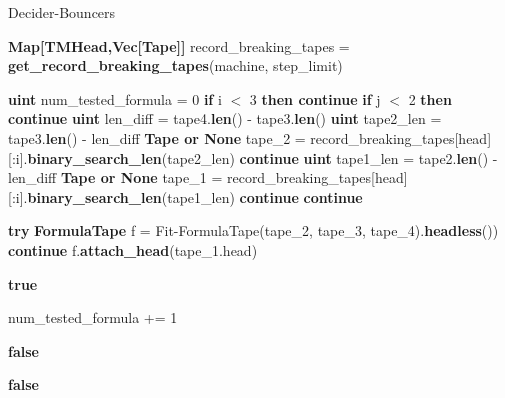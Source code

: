 \begin{algorithm}[h!]
    \caption{{\sc Decider-Bouncers}}\label{alg:decider-bouncers}
    \begin{algorithmic}[1]


        \State \textbf{Map[TMHead,Vec[Tape]]} record\_breaking\_tapes = \textbf{get\_record\_breaking\_tapes}(machine, step\_limit)

        \State \textbf{uint} num\_tested\_formula = 0
        \State \textbf{if} i $<$ 3 \textbf{then continue}
        \State \textbf{if} j $<$ 2 \textbf{then continue}
        \State \textbf{uint} len\_diff = tape4.\textbf{len}() - tape3.\textbf{len}()
        \State \textbf{uint} tape2\_len = tape3.\textbf{len}() - len\_diff
        \State \textbf{Tape or None} tape\_2 = record\_breaking\_tapes[head][:i].\textbf{binary\_search\_len}(tape2\_len)
        \State \textbf{continue}
        \EndIf
        \State
        \State \textbf{uint} tape1\_len = tape2.\textbf{len}() - len\_diff
        \State \textbf{Tape or None} tape\_1 = record\_breaking\_tapes[head][:i].\textbf{binary\_search\_len}(tape1\_len)
        \State \textbf{continue}
        \EndIf
        \State
        \State \textbf{continue}
        \EndIf

        \State

        \State \textbf{try} \textbf{FormulaTape} f = {\sc Fit-FormulaTape}(tape\_2, tape\_3, tape\_4).\textbf{headless}())
        \State \textbf{continue}
        \EndIf
        \State
        \State f.\textbf{attach\_head}(tape\_1.head)

        \State \Return \textbf{true}

        \EndIf

        \State
        \State num\_tested\_formula += 1

        \State
        \State \Return \textbf{false}
        \EndIf


        \EndFor
        \EndFor
        \EndFor
        \State \Return \textbf{false}
        \EndProcedure
    \end{algorithmic}
\end{algorithm}

